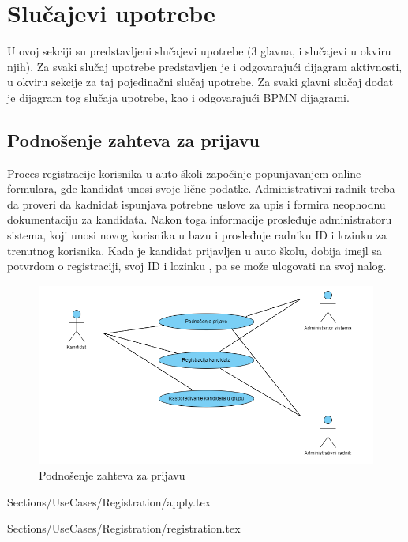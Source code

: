 \section{Slučajevi upotrebe}
\label{sec:podnaslov2}
U ovoj sekciji su predstavljeni slučajevi upotrebe (3 glavna, i slučajevi u okviru njih).
Za svaki slučaj upotrebe predstavljen je i odgovarajući dijagram aktivnosti, 
u okviru sekcije za taj pojedinačni slučaj upotrebe.
Za svaki glavni slučaj dodat je dijagram tog slučaja upotrebe, kao i odgovarajući BPMN dijagrami.
\subsection {Podnošenje zahteva za prijavu}
Proces registracije korisnika u auto školi započinje popunjavanjem online formulara, gde kandidat unosi svoje lične podatke. Administrativni radnik treba da proveri da kadnidat ispunjava potrebne uslove za upis i formira neophodnu dokumentaciju za kandidata. Nakon toga informacije prosleđuje administratoru sistema, koji unosi novog korisnika u bazu i prosleđuje radniku ID i lozinku za trenutnog korisnika. Kada je kandidat prijavljen u auto školu, dobija imejl sa potvrdom o registraciji, svoj ID i lozinku , pa se može ulogovati na svoj nalog. 

\begin{figure}[H]
    \begin{center}
        \includegraphics[width=120mm, height=60mm]{Diagrams/podnosenje_zahteva_za_prijavu.png}
    \end{center}
    \caption {Podnošenje zahteva za prijavu}
    \label{usecase_podnosenje_zahteva_za_prijavu}

\end{figure}



 {Sections/UseCases/Registration/apply.tex}

 {Sections/UseCases/Registration/registration.tex}


